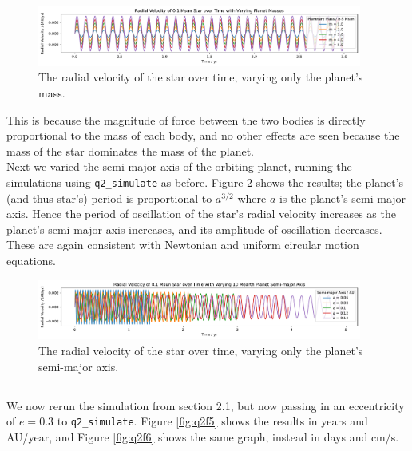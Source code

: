 \documentclass{article}
\newcommand{\simf}{\texttt{q2\_simulate}}
\begin{document}
\begin{figure}[htp]
    \centering
    \includegraphics[width=0.95\textwidth]{q2f3.pdf}
    \captionsetup{justification=centering}
    \caption{The radial velocity of the star over time, varying only the planet's mass.}
    \label{fig:q2f3}
\end{figure}

This is because the magnitude of force between the two bodies is directly proportional to the mass of each body, and no other effects are seen because the mass of the star dominates the mass of the planet.\\

Next we varied the semi-major axis of the orbiting planet, running the simulations using \simf{} as before. Figure \ref{fig:q2f4} shows the results; the planet's (and thus star's) period is proportional to $a^{3/2}$ where $a$ is the planet's semi-major axis. Hence the period of oscillation of the star's radial velocity increases as the planet's semi-major axis increases, and its amplitude of oscillation decreases. These are again consistent with Newtonian and uniform circular motion equations. 

\begin{figure}[htp]
    \centering
    \includegraphics[width=0.95\textwidth]{q2f4.pdf}
    \captionsetup{justification=centering}
    \caption{The radial velocity of the star over time, varying only the planet's semi-major axis.}
    \label{fig:q2f4}
\end{figure}

\newpage

\subsection{}

We now rerun the simulation from section 2.1, but now passing in an eccentricity of $e = 0.3$ to \simf{}. Figure \ref{fig:q2f5} shows the results in years and AU/year, and Figure \ref{fig:q2f6} shows the same graph, instead in days and cm/s.
\end{document}

